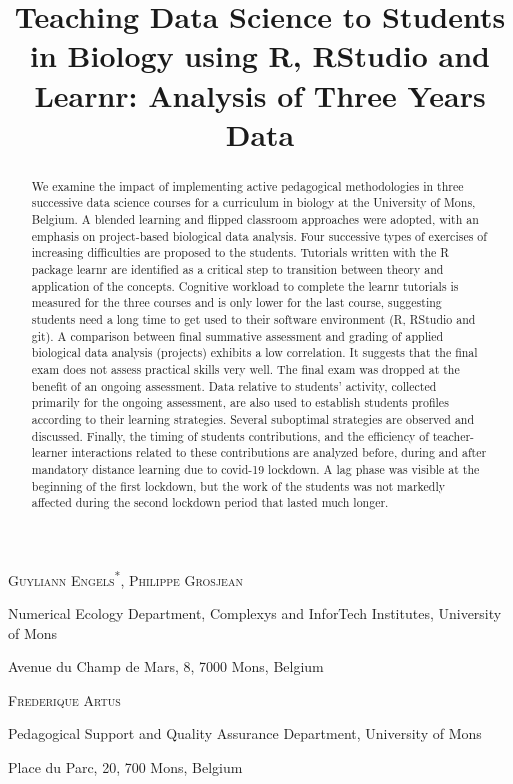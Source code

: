 \documentclass{aims}
\title[Teaching Data Science in
Biology] %
      {Teaching Data Science to Students in Biology using R, RStudio and
Learnr: Analysis of Three Years Data}
\author[Guyliann Engels, Philippe Grosjean and Frédérique Artus]{}
\theoremstyle{definition}
\begin{document}
\maketitle

\centerline{\scshape Guyliann Engels\textsuperscript{*}, Philippe Grosjean}
\medskip
{\footnotesize
 \centerline{Numerical Ecology Department, Complexys and InforTech Institutes, University of Mons}
   \centerline{Avenue du Champ de Mars, 8, 7000 Mons, Belgium}
} %

\medskip

\centerline{\scshape Frederique Artus}

\medskip
{\footnotesize
 \centerline{ Pedagogical Support and Quality Assurance Department, University of Mons}
   \centerline{Place du Parc, 20, 700 Mons, Belgium}
}

\bigskip



\begin{abstract}
   We examine the impact of implementing active pedagogical
  methodologies in three successive data science courses for a
  curriculum in biology at the University of Mons, Belgium. A blended
  learning and flipped classroom approaches were adopted, with an
  emphasis on project-based biological data analysis. Four successive
  types of exercises of increasing difficulties are proposed to the
  students. Tutorials written with the R package learnr are identified
  as a critical step to transition between theory and application of the
  concepts. Cognitive workload to complete the learnr tutorials is
  measured for the three courses and is only lower for the last course,
  suggesting students need a long time to get used to their software
  environment (R, RStudio and git). A comparison between final summative
  assessment and grading of applied biological data analysis (projects)
  exhibits a low correlation. It suggests that the final exam does not
  assess practical skills very well. The final exam was dropped at the
  benefit of an ongoing assessment. Data relative to students' activity,
  collected primarily for the ongoing assessment, are also used to
  establish students profiles according to their learning strategies.
  Several suboptimal strategies are observed and discussed. Finally, the
  timing of students contributions, and the efficiency of
  teacher-learner interactions related to these contributions are
  analyzed before, during and after mandatory distance learning due to
  covid-19 lockdown. A lag phase was visible at the beginning of the
  first lockdown, but the work of the students was not markedly affected
  during the second lockdown period that lasted much longer.
\end{abstract}
\end{document}
